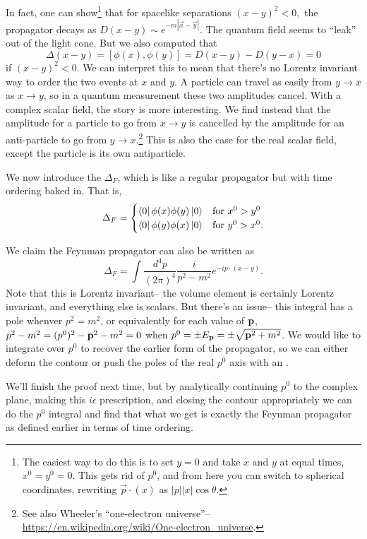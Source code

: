 In fact, one can show\footnote{The easiest way to do this is to set $y=0$ and take $x$ and $y$ at equal times, $x^0=y^0=0$. This gets rid of $p^0$, and from here you can switch to spherical coordinates, rewriting $\vec p \cdot (x)$ as $|p||x|\cos\theta$.} that for spacelike separations $(x-y)^2<0,$ the propagator decays as $D(x-y)\sim e^{-m|\vec x-\vec y|}.$ The quantum field seems to ``leak'' out of the light cone. But we also computed that
$$\Delta(x-y)=[\phi(x),\phi(y)] =D(x-y)-D(y-x)=0$$ if $(x-y)^2<0$. We can interpret this to mean that there's no Lorentz invariant way to order the two events at $x$ and $y$. A particle can travel as easily from $y\to x$ as $x\to y$, so in a quantum measurement these two amplitudes cancel. With a complex scalar field, the story is more interesting. We find instead that the amplitude for a particle to go from $x\to y$ is cancelled by the amplitude for an anti-particle to go from $y\to x$.\footnote{See also Wheeler's ``one-electron universe''-- \url{https://en.wikipedia.org/wiki/One-electron_universe}.} This is also the case for the real scalar field, except the particle is its own antiparticle.

\begin{defn}
We now introduce the  $\Delta_F$, which is like a regular propagator but with time ordering baked in. That is,
$$\Delta_F =\begin{cases}
  \left< 0 \right|\phi(x)\phi(y)\left| 0 \right> & \text{for } x^0 > y^0\\    
  \left< 0 \right|\phi(y)\phi(x)\left| 0 \right> & \text{for } y^0 > x^0.
\end{cases}$$
\end{defn}


We claim the Feynman propagator can also be written as
$$\Delta_F =\int \frac{d^4p}{(2\pi)^4}\frac{i}{p^2-m^2}e^{-ip\cdot (x-y)}.$$
Note that this is Lorentz invariant-- the volume element is certainly Lorentz invariant, and everything else is scalars. But there's an issue-- this integral has a pole whenver $p^2=m^2$, or equivalently for each value of $\boldsymbol{\mathbf{p}}$, $p^2-m^2=(p^0)^2-\boldsymbol{\mathbf{p}}^2-m^2=0$ when $p^0= \pm E_{\boldsymbol{\mathbf{p}}}=\pm \sqrt{ \boldsymbol{\mathbf{p}}^2+m^2}$. We would like to integrate over $p^0$ to recover the earlier form of the propagator, so we can either deform the contour or push the poles of the real $p^0$ axis with an .

We'll finish the proof next time, but by analytically continuing $p^0$ to the complex plane, making this $i\epsilon$ prescription, and closing the contour appropriately we can do the $p^0$ integral and find that what we get is exactly the Feynman propagator as defined earlier in terms of time ordering.